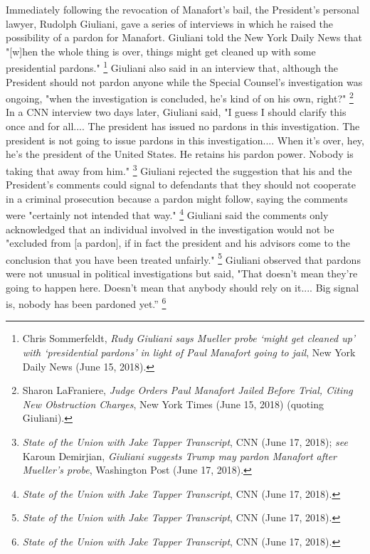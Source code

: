 Immediately following the revocation of Manafort's bail, the President's personal lawyer, Rudolph Giuliani, gave a series of interviews in which he raised the possibility of a pardon for Manafort.
Giuliani told the New York Daily News that "[w]hen the whole thing is over, things might get cleaned up with some presidential pardons."%
\footnote{Chris Sommerfeldt, \textit{Rudy Giuliani says Mueller probe ‘might get cleaned up’ with ‘presidential pardons’ in light of Paul Manafort going to jail}, New York Daily News (June 15, 2018).}
Giuliani also said in an interview that, although the President should not pardon anyone while the Special Counsel's investigation was ongoing, "when the investigation is concluded, he's kind of on his own, right?"%
\footnote{Sharon LaFraniere, \textit{Judge Orders Paul Manafort Jailed Before Trial, Citing New Obstruction Charges}, New York Times (June 15, 2018) (quoting Giuliani).}
In a CNN interview two days later, Giuliani said, "I guess I should clarify this once and for all....
The president has issued no pardons in this investigation.
The president is not going to issue pardons in this investigation.... When it's over, hey, he's the president of the United States.
He retains his pardon power.
Nobody is taking that away from him."%
\footnote{\textit{State of the Union with Jake Tapper Transcript}, CNN (June 17, 2018);
\textit{see} Karoun Demirjian, \textit{Giuliani suggests Trump may pardon Manafort after Mueller’s probe}, Washington Post (June 17, 2018).}
Giuliani rejected the suggestion that his and the President's comments could signal to defendants that they should not cooperate in a criminal prosecution because a pardon might follow, saying the comments were "certainly not intended that way."%
\footnote{\textit{State of the Union with Jake Tapper Transcript}, CNN (June 17, 2018).}
Giuliani said the comments only acknowledged that an individual involved in the investigation would not be "excluded from [a pardon], if in fact the president and his advisors come to the conclusion that you have been treated unfairly."%
\footnote{\textit{State of the Union with Jake Tapper Transcript}, CNN (June 17, 2018).}
Giuliani observed that pardons were not unusual in political investigations but said, "That doesn't mean they're going to happen here.
Doesn't mean that anybody should rely on it....
Big signal is, nobody has been pardoned yet.''%
\footnote{\textit{State of the Union with Jake Tapper Transcript}, CNN (June 17, 2018).}

